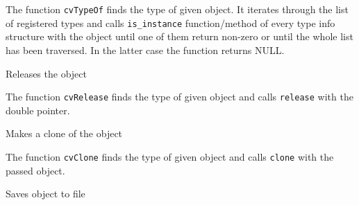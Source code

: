 \begin{description}
\end{description}

The function \texttt{cvTypeOf} finds the type of given object. It iterates
through the list of registered types and calls \texttt{is\_instance}
function/method of every type info structure with the object until one
of them return non-zero or until the whole list has been traversed. In
the latter case the function returns NULL.

\label{Release}

Releases the object


\begin{description}
\end{description}

The function \texttt{cvRelease} finds the type of given object and calls \texttt{release} with the double pointer.

\label{Clone}

Makes a clone of the object


\begin{description}
\end{description}

The function \texttt{cvClone} finds the type of given object and calls \texttt{clone} with the passed object.

\label{Save}

Saves object to file


\begin{description}
\end{description}

